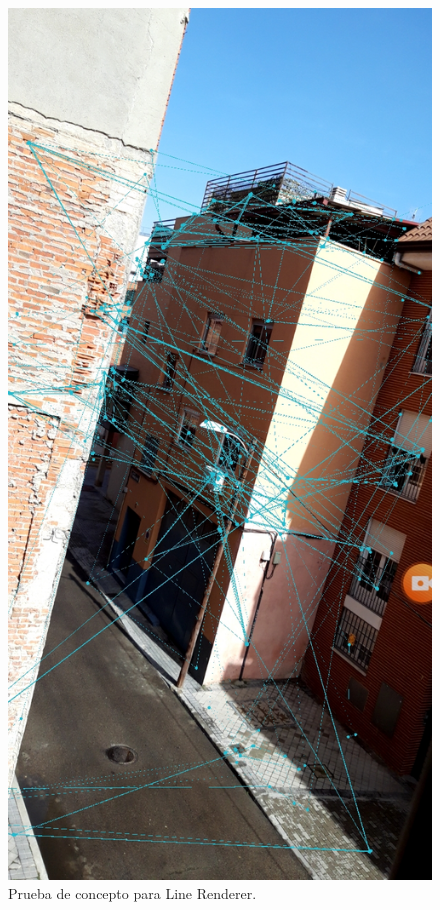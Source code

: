 \begin{figure}[H]
    \centering
    \includegraphics[scale=0.2]{Sections/Contribuciones/Imagenes/LineRenderer.jpg}
    \caption[Prueba de concepto para Line Renderer.]{Prueba de concepto para Line Renderer.}
    \label{fig:LineRender}
\end{figure}


